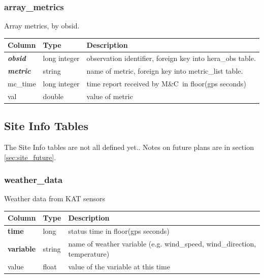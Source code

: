 \documentclass{article}
\newcommand{\mc}{M\&C}
\begin{document}
\subsubsection{array\_metrics}
Array metrics, by obsid.

\begin{center}
 \begin{tabular}{| p{4cm} | p{2cm} | p{10cm} |}
\hline
 {\bf Column} & {\bf Type}  & {\bf Description} \\ [0.5ex]  \hline\hline
\textbf{\textit{obsid}} & long integer & observation identifier, foreign key into hera\_obs table. \\ \hline
\textbf{\textit{metric}} & string & name of metric, foreign key into metric\_list table. \\ \hline
mc\_time & long integer & time report received by \mc\ in floor(gps seconds) \\ \hline
val & double & value of metric \\ \hline
\end{tabular}
\end{center}



\subsection{Site Info Tables}
The Site Info tables are not all defined yet.. Notes on future plans are in section \ref{sec:site_future}.

\subsubsection{weather\_data}
Weather data from KAT sensors
\begin{center}
 \begin{tabular}{| p{4cm} | p{2cm} | p{10cm} |}
\hline
 {\bf Column} & {\bf Type}  & {\bf Description} \\ [0.5ex]  \hline\hline
\textbf{time} & long & status time in floor(gps seconds)\\ \hline
\textbf{variable} & string & name of weather variable (e.g. wind\_speed,  wind\_direction, temperature) \\ \hline
value & float & value of the variable at this time \\\hline
\end{tabular}
\end{center}
\end{document}
